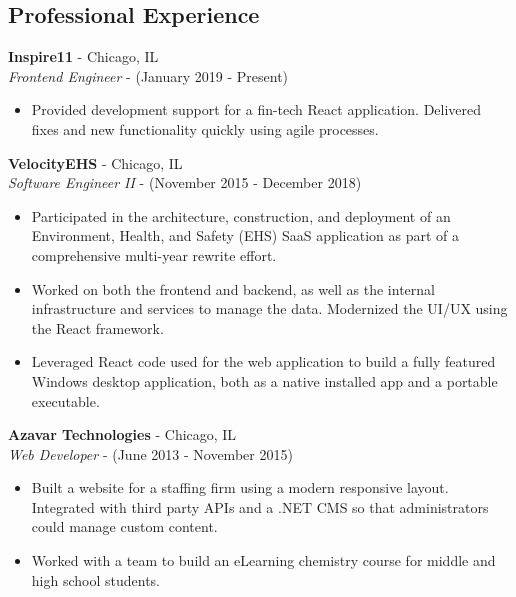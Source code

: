 \documentclass[12pt]{article}
\begin{document}
\begin{paracol}{2}
\switchcolumn 

\subsection*{Professional Experience} 

\textbf{Inspire11} - Chicago, IL \\
\textit{Frontend Engineer} - {\footnotesize{(January 2019 - Present)}} 
\begin{itemize}
    \item {\footnotesize{Provided development support for a fin-tech React application. Delivered fixes and new functionality quickly using agile processes.}}
\end{itemize} 

\noindent \textbf{VelocityEHS} - Chicago, IL \\
\textit{Software Engineer II} - {\footnotesize{(November 2015 - December 2018)}}
\begin{itemize}
    \item {\footnotesize{Participated in the architecture, construction, and deployment of an Environment, Health, and Safety (EHS) SaaS application as part of a comprehensive multi-year rewrite effort.}}
    \item {\footnotesize{Worked on both the frontend and backend, as well as the internal infrastructure and services to manage the data.  Modernized the UI/UX using the React framework.}}
    \item {\footnotesize{Leveraged React code used for the web application to build a fully featured Windows desktop application, both as a native installed app and a portable executable.}}
\end{itemize} 

\noindent \textbf{Azavar Technologies} - Chicago, IL \\
\textit{Web Developer} - {\footnotesize(June 2013 - November 2015)}
\begin{itemize}
    \item {\footnotesize{Built a website for a staffing firm using a modern responsive layout. Integrated with third party APIs and a .NET CMS so that administrators could manage custom content.}}
    \item {\footnotesize{Worked with a team to build an eLearning chemistry course for middle and high school students.}} 
\end{itemize}


\end{paracol}
\end{document}
